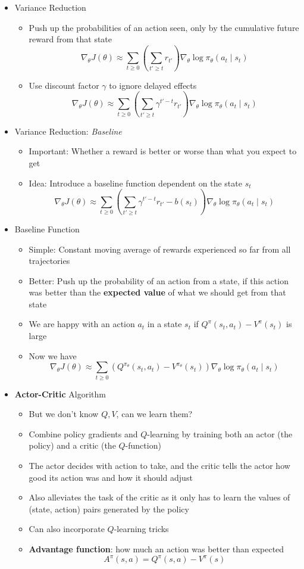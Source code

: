 \begin{itemize}
	\item Variance Reduction
	\begin{itemize}
		\item Push up the probabilities of an action seen, only by the cumulative future reward from that state
		$$\nabla_\theta J(\theta) \approx \sum_{t\geq 0}\left(\sum_{t'\geq t} r_{t'}\right) \nabla_\theta \log \pi_{\theta}(a_t\mid s_t)$$
		\item Use discount factor $\gamma$ to ignore delayed effects
		$$\nabla_\theta J(\theta) \approx \sum_{t\geq 0}\left(\sum_{t'\geq t} \gamma^{t'-t} r_{t'}\right) \nabla_\theta \log \pi_{\theta}(a_t\mid s_t)$$
	\end{itemize}
	\item Variance Reduction: \textit{Baseline}
	\begin{itemize}
		\item Important: Whether a reward is better or worse than what you expect to get 
		\item Idea: Introduce a baseline function dependent on the state $s_t$
		$$\nabla_\theta J(\theta) \approx \sum_{t\geq 0}\left(\sum_{t'\geq t} \gamma^{t'-t} r_{t'} - b(s_t)\right) \nabla_\theta \log \pi_{\theta}(a_t\mid s_t)$$
	\end{itemize}
	\item Baseline Function
	\begin{itemize}
		\item Simple: Constant moving average of rewards experienced so far from all trajectories
		\item Better: Push up the probability of an action from a state, if this action was better than the \textbf{expected value} of what we should get from that state
		\item We are happy with an action $a_t$ in a state $s_t$ if $Q^\pi (s_t, a_t)-V^\pi (s_t)$ is large
		\item Now we have
		$$\nabla_\theta J(\theta) \approx \sum_{t\geq 0}\left( Q^{\pi_\theta} (s_t, a_t) - V^{\pi_\theta}(s_t)\right) \nabla_\theta \log \pi_{\theta}(a_t\mid s_t)$$
	\end{itemize}
	\item \textbf{Actor-Critic} Algorithm
	\begin{itemize}
		\item But we don't know $Q, V$, can we learn them?
		\item Combine policy gradients and $Q$-learning by training both an actor (the policy) and a critic (the $Q$-function)
		\item The actor decides with action to take, and the critic tells the actor how good its action was and how it should adjust
		\item Also alleviates the task of the critic as it only has to learn the values of (state, action) pairs generated by the policy
		\item Can also incorporate $Q$-learning tricks
		\item \textbf{Advantage function}: how much an action was better than expected $$A^\pi (s, a) = Q^\pi (s, a) - V^\pi(s)$$
	\end{itemize}
\end{itemize}
